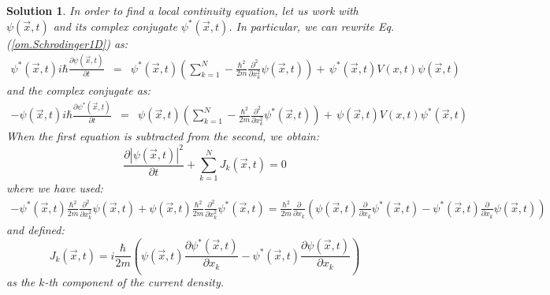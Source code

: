 \documentclass[onecolumn,nofootinbib, secnumarabic, amsmath, nobibnotes,12pt,aps,pra]{revtex4-1}
\newtheorem{solution}{Solution}
\newcommand{\eref}[1]{Eq. (\ref{#1})}
\begin{document}
\begin{solution}

In order to find a local continuity equation, let us work with $\psi(\vec{x},t)$ and its complex conjugate $\psi^*(\vec x,t)$. In particular, we can rewrite \eref{om.Schrodinger1D} as:
\begin{eqnarray}
\psi^*(\vec x,t) i \hbar \frac{\partial \psi(\vec x,t)} {\partial t}
&=& \psi^*(\vec x,t)\left( \sum_{k = 1}^N -\frac{\hbar^2}{2m}\frac
{\partial^2} {\partial x_k^2} \psi(\vec x,t)\right) +\, \psi^*(\vec x,t) V(x,t) \psi(\vec x,t)
\end{eqnarray}
and the complex conjugate as:
\begin{eqnarray}
-\psi(\vec x,t)i \hbar \frac{\partial \psi^*(\vec x,t)} {\partial t} &=& \psi(\vec x,t)\left( \sum_{k = 1}^N - \frac{\hbar^2}{2m}\frac {\partial^2} {\partial x_k^2} \psi^*(\vec x,t) \right)+\, \psi(\vec x,t)V(x,t) \psi^*(\vec x,t)
\end{eqnarray}
When the first equation is subtracted from the second, we obtain:
\begin{equation}
\frac{\partial |\psi(\vec{x},t)|^2} {\partial t} + \sum_{k = 1}^{N} J_k(\vec{x},t) = 0
\end{equation}
where we have used:
\begin{eqnarray}
- \psi^*(\vec x,t)\frac{\hbar^2}{2m}\frac {\partial^2} {\partial x_k^2} \psi(\vec x,t) + \psi(\vec x,t)\frac{\hbar^2}{2m}\frac {\partial^2} {\partial x_k^2} \psi^*(\vec x,t) = \frac{\hbar^2}{2m} \frac {\partial} {\partial x_k} \left( \psi(\vec x,t)\frac {\partial} {\partial x_k} \psi^*(\vec x,t)-\psi^*(\vec x,t)\frac {\partial} {\partial x_k} \psi(\vec x,t) \right)\qquad
\end{eqnarray}
and defined:
\begin{equation}
J_k(\vec{x},t) = i \frac {\hbar} {2 m} \left( \psi(\vec{x},t) \frac {\partial \psi^{*}(\vec{x},t)} {\partial x_k}- \psi^{*}(\vec{x},t) \frac {\partial \psi(\vec{x},t)} {\partial x_k} \right)
\end{equation}
as the $k$-th component of the current density.


\end{solution}


\makeatletter
\renewcommand\thesection{A.\arabic{section}}
\setcounter{section}{0}
\renewcommand\theequation{A.\@arabic\c@equation}
\setcounter{equation}{0}
\renewcommand\thetable{A.\@arabic\c@table}
\setcounter{table}{0}
\renewcommand\thefigure{A.\@arabic\c@figure}
\setcounter{figure}{0}
\makeatother
\end{document}
